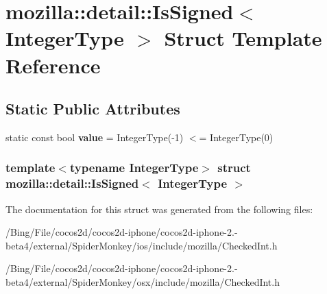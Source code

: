 \hypertarget{structmozilla_1_1detail_1_1_is_signed}{\section{mozilla\-:\-:detail\-:\-:Is\-Signed$<$ Integer\-Type $>$ Struct Template Reference}
\label{structmozilla_1_1detail_1_1_is_signed}
}
\subsection*{Static Public Attributes}
\begin{DoxyCompactItemize}
\item 
\hypertarget{structmozilla_1_1detail_1_1_is_signed_a04ec99838cd061d9eecbb36f01685073}{static const bool {\bfseries value} = Integer\-Type(-\/1) $<$= Integer\-Type(0)}\label{structmozilla_1_1detail_1_1_is_signed_a04ec99838cd061d9eecbb36f01685073}

\end{DoxyCompactItemize}
\subsubsection*{template$<$typename Integer\-Type$>$ struct mozilla\-::detail\-::\-Is\-Signed$<$ Integer\-Type $>$}



The documentation for this struct was generated from the following files\-:\begin{DoxyCompactItemize}
\item 
/\-Bing/\-File/cocos2d/cocos2d-\/iphone/cocos2d-\/iphone-\/2.-\/beta4/external/\-Spider\-Monkey/ios/include/mozilla/Checked\-Int.\-h\item 
/\-Bing/\-File/cocos2d/cocos2d-\/iphone/cocos2d-\/iphone-\/2.-\/beta4/external/\-Spider\-Monkey/osx/include/mozilla/Checked\-Int.\-h\end{DoxyCompactItemize}
